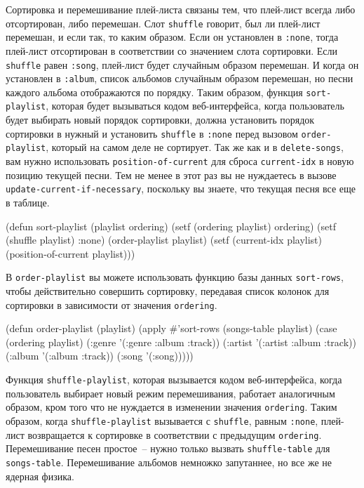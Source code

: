 Сортировка и перемешивание плей-листа связаны тем, что плей-лист всегда либо отсортирован,
либо перемешан. Слот \lstinline{shuffle} говорит, был ли плей-лист перемешан, и если так, то каким
образом. Если он установлен в \lstinline{:none}, тогда плей-лист отсортирован в соответствии со
значением слота сортировки. Если \lstinline{shuffle} равен \lstinline{:song}, плей-лист будет
случайным образом перемешан. И когда он установлен в \lstinline{:album}, список альбомов
случайным образом перемешан, но песни каждого альбома отображаются по порядку. Таким
образом, функция \lstinline{sort-playlist}, которая будет вызываться кодом веб-интерфейса, когда
пользователь будет выбирать новый порядок сортировки, должна установить порядок сортировки
в нужный и установить \lstinline{shuffle} в \lstinline{:none} перед вызовом \lstinline{order-playlist},
который на самом деле не сортирует. Так же как и в \lstinline{delete-songs}, вам нужно
использовать \lstinline{position-of-current} для сброса \lstinline{current-idx} в новую позицию
текущей песни. Тем не менее в этот раз вы не нуждаетесь в вызове
\lstinline{update-current-if-necessary}, поскольку вы знаете, что текущая песня все еще в
таблице.

\begin{myverb}
(defun sort-playlist (playlist ordering)
  (setf (ordering playlist) ordering)
  (setf (shuffle playlist) :none)
  (order-playlist playlist)
  (setf (current-idx playlist) (position-of-current playlist)))
\end{myverb}

В \lstinline{order-playlist} вы можете использовать функцию базы данных \lstinline{sort-rows}, чтобы
действительно совершить сортировку, передавая список колонок для сортировки в зависимости
от значения \lstinline{ordering}.

\begin{myverb}
(defun order-playlist (playlist)
  (apply #'sort-rows (songs-table playlist)
    (case (ordering playlist)
      (:genre  '(:genre :album :track))
      (:artist '(:artist :album :track))
      (:album  '(:album :track))
      (:song   '(:song)))))
\end{myverb}

Функция \lstinline{shuffle-playlist}, которая вызывается кодом веб-интерфейса, когда
пользователь выбирает новый режим перемешивания, работает аналогичным образом, кром того
что не нуждается в изменении значения \lstinline{ordering}. Таким образом, когда
\lstinline{shuffle-playlist} вызывается с \lstinline{shuffle}, равным \lstinline{:none}, плей-лист
возвращается к сортировке в соответствии с предыдущим \lstinline{ordering}. Перемешивание песен
простое~-- нужно только вызвать \lstinline{shuffle-table} для \lstinline{songs-table}.
Перемешивание альбомов немножко запутаннее, но все же не ядерная физика.

